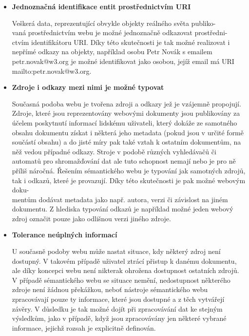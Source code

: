 \documentclass{projekt}
\begin{document}
\begin {itemize}

\item \textbf{Jednoznačná identifikace entit prostřednictvím URI}

\hspace{0.65cm}Veškerá data, reprezentující obvykle objekty reálného světa publiko-\\vaná prostřednictvím webu je možné jednoznačně odkazovat prostředni-\\ctvím identifikátoru URI. Díky této skutečnosti je tak možné realizovat i nepřímé odkazy na objekty, například osobu Petr Novák s emailem petr.novak@w3.org je možné identifikovat jako osobou, jejíž email má URI mailto:petr.novak@w3.org.


\item \textbf{Zdroje i odkazy mezi nimi je možné typovat}

\hspace{0.65cm}Současná podoba webu je tvořena zdroji a odkazy jež je vzájemně propojují. Zdroje, které jsou reprezentovány webovými dokumenty jsou publikovány za účelem poskytnutí informací lidskému uživateli, který dokáže ze samotného obsahu dokumentu získat i některá jeho metadata (pokud jsou v určité formě součástí obsahu) a do jisté míry pak také vztah k ostatním dokumentům, na něž vedou případné odkazy. Stroje v podobě různých vyhledávačů či automatů pro shromažďování dat ale tuto schopnost nemají nebo je pro ně příliš náročná. Řešením sémantického webu je typování jak samotných zdrojů, tak i odkazů, které je provazují. Díky této skutečnosti je pak možné webovým doku-\\mentům dodávat metadata jako např. autora, verzi či závislost na jiném dokumentu. Z hlediska typování odkazů je například možné jeden webový zdroj označit pouze jako odlišnou verzi jiného zdroje.


\item \textbf{Tolerance neúplných informací}

\hspace{0.65cm}U současně podoby webu může nastat situace, kdy některý zdroj není dostupný. V takovém případě uživatel ztrácí přistup k danému dokumentu, ale díky koncepci webu není nikterak ohrožena dostupnost ostatních zdrojů. V případě sémantického webu se situace nemění, nedostupnost některého zdroje není žádnou překážkou, neboť nástroje sémantického webu zpracovávají pouze ty informace, které jsou dostupné a z těch vytvářejí závěry. V důsledku je tak možné dojít při zpracovávání dat ke stejným výsledkům, jako v případě, když jsou zpracovávány jen některé vybrané informace, jejichž rozsah je explicitně definován.


\end{itemize}
\end{document}
